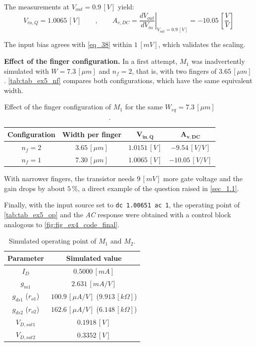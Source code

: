\documentclass[12pt,a4paper]{article}
\begin{document}
The measurements at $V_{out} = 0.9 \, [V]$ yield:
\begin{equation}
    V_{in,Q} = 1.0065 \, [V] \qquad , \qquad A_{v,DC} = \left. \frac{dV_{out}}{dV_{in}} \right|_{V_{out} = 0.9 \, [V]} = -10.05 \, \left[\frac{V}{V}\right]
    \label{eq_40}
\end{equation}
 
The input bias agrees with \autoref{eq_38} within $1 \, [mV]$, which validates the scaling.
 
\textbf{Effect of the finger configuration.} In a first attempt, $M_{1}$ was inadvertently simulated with $W = 7.3 \, [\mu m]$ and $n_{f} = 2$, that is, with two fingers of $3.65 \, [\mu m]$. \autoref{tab:tab_ex5_nf} compares both configurations, which have the same equivalent width.
\begin{table}[H]
    \centering
    \begin{tabular}{|c|c|c|c|}
        \hline
        \textbf{Configuration} & \textbf{Width per finger} & $\mathbf{V_{in,Q}}$ & $\mathbf{A_{v,DC}}$ \\
        \hline
        $n_{f} = 2$     & $3.65 \, [\mu m]$        & $1.0151 \, [V]$      & $-9.54 \, [V/V]$ \\
        $n_{f} = 1$     & $7.30 \, [\mu m]$        & $1.0065 \, [V]$      & $-10.05 \, [V/V]$ \\
        \hline
    \end{tabular}
    \caption{Effect of the finger configuration of $M_{1}$ for the same $W_{eq} = 7.3 \, [\mu m]$.}
    \label{tab:tab_ex5_nf}
\end{table}
 
With narrower fingers, the transistor needs $9 \, [mV]$ more gate voltage and the gain drops by about $5 \, \%$, a direct example of the question raised in \autoref{sec_1.1}.
 
Finally, with the input source set to \texttt{dc 1.00651 ac 1}, the operating point of \autoref{tab:tab_ex5_op} and the \textit{AC} response were obtained with a control block analogous to \autoref{fig:fig_ex4_code_final}.
\begin{table}[H]
    \centering
    \begin{tabular}{|c|c|}
        \hline
        \textbf{Parameter} & \textbf{Simulated value} \\
        \hline
        $I_{D}$                     & $0.5000 \, [mA]$ \\
        $g_{m1}$                    & $2.631 \, [mA/V]$ \\
        $g_{ds1}$ ($r_{o1}$)        & $100.9 \, [\mu A/V]$ ($9.913 \, [k\Omega]$) \\
        $g_{ds2}$ ($r_{o2}$)        & $162.6 \, [\mu A/V]$ ($6.148 \, [k\Omega]$) \\
        $V_{D,sat1}$                & $0.1918 \, [V]$ \\
        $V_{D,sat2}$                & $0.3352 \, [V]$ \\
        \hline
    \end{tabular}
    \caption{Simulated operating point of $M_{1}$ and $M_{2}$.}
    \label{tab:tab_ex5_op}
\end{table}
 
\end{document}
